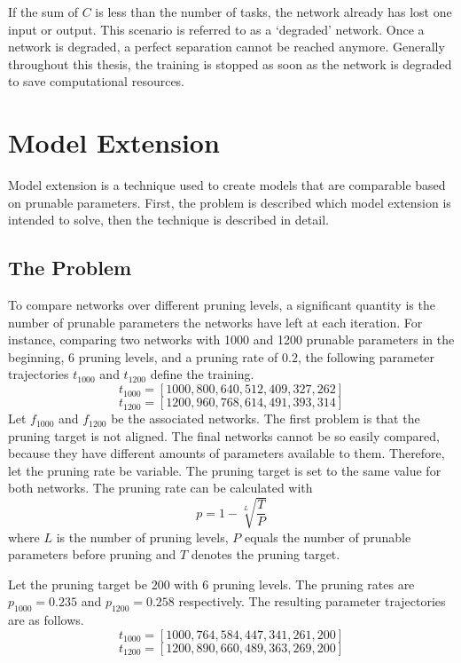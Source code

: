 If the sum of $C$ is less than the number of tasks, the network already has lost one input or output.
This scenario is referred to as a `degraded' network.
Once a network is degraded, a perfect separation cannot be reached anymore.
Generally throughout this thesis, the training is stopped as soon as the network is degraded to save computational resources.

\section{Model Extension}
Model extension is a technique used to create models that are comparable based on prunable parameters. 
First, the problem is described which model extension is intended to solve, then the technique is described in detail.
\subsection{The Problem}
To compare networks over different pruning levels, a significant quantity is the number of prunable parameters the networks have left at each iteration.
For instance, comparing two networks with 1000 and 1200 prunable parameters in the beginning, 6 pruning levels, and a pruning rate of $0.2$, the following parameter trajectories $t_{1000}$ and $t_{1200}$ define the training.
\[
t_{1000} = [1000, 800, 640, 512, 409, 327, 262]
\]
\[
t_{1200} = [1200, 960, 768, 614, 491, 393, 314]
\]
Let $f_{1000}$ and $f_{1200}$ be the associated networks.
The first problem is that the pruning target is not aligned.
The final networks cannot be so easily compared, because they have different amounts of parameters available to them.
Therefore, let the pruning rate be variable. The pruning target is set to the same value for both networks.
The pruning rate can be calculated with 
\[
p = 1 - \sqrt[L]{\frac{T}{P}}
\]
where $L$ is the number of pruning levels, $P$ equals the number of prunable parameters before pruning and $T$ denotes the pruning target.

Let the pruning target be $200$ with 6 pruning levels.
The pruning rates are $p_{1000} = 0.235$ and $p_{1200} = 0.258$ respectively.
The resulting parameter trajectories are as follows.
\[
t_{1000} = [1000, 764, 584, 447, 341, 261, 200]
\]
\[
t_{1200} = [1200, 890, 660, 489, 363, 269, 200]
\]

